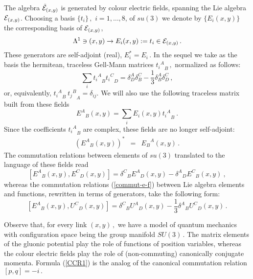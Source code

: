 \documentclass[a4paper,12pt]{article}
\begin{document}
The algebra $\tilde{\cal E}_{(x,y)}$ is generated by colour
electric fields, spanning the Lie algebra ${\cal E}_{(x,y)}$.
Choosing a basis $\{t_i \} \, ,$ $i = 1, \dots , 8$, of $su(3)$ we
denote by $\{ E_i(x,y)\}$ the corresponding basis of ${\cal
E}_{(x,y)}$,
\begin{equation}
{\Lambda}^1 \ni (x,y) \rightarrow  {E}_i(x,y) :=  t_i \in {\cal
E}_{(x,y)} \, .
\end{equation}
These generators are self-adjoint (real), $E_i^* = E_i \, .$ In
the sequel we take as the basis the hermitean, traceless Gell-Mann
matrices ${{t_i}^A}_B \, ,$ normalized as follows:
\begin{equation}
\sum_i { { t_i}^A}_B { { t_i}^C}_D = \delta^A_D \delta^C_B - \frac
13 \delta^A_B \delta^C_D \, ,
\end{equation}
or, equivalently, $  { { t_i}^A}_B \ { { t_j}^B}_A = \delta_{ij}
$. We will also use the following traceless matrix built from
these fields
\begin{equation}
{E^A}_B(x,y) = \sum_i E_i (x,y) { { t_i}^A}_B \  . \label{EABEi}
\end{equation}
Since the coefficients ${ { t_i}^A}_B$ are complex, these fields
are no longer self-adjoint:
\begin{eqnarray}
\label{self-adj} ({E^A}_B(x,y))^* & = & {E_B}^A(x,y) \, .
\end{eqnarray}
The commutation relations between elements of $su(3)$ translated
to the language of these fields read
\begin{equation}
\label{CCR2} [{E^A}_B(x,y) , {E^C}_D(x,y)] = {\delta^C}_B
{E^A}_D(x,y)  - {\delta^A}_D {E^C}_B(x,y)   \ ,
\end{equation}
whereas the commutation relations (\ref{commut-e-f}) between Lie
algebra elements and functions, rewritten in terms of generators,
take the following form:
\begin{equation}
\label{CCR1} [{E^A}_B(x,y) , {U^C}_D(x,y)] = {\delta^C}_B
{U^A}_D(x,y) - \frac{1}{3} {\delta^A}_B {U^C}_D(x,y)   \, .
\end{equation}


Observe that, for every link $(x,y)\, ,$ we have a model of
quantum mechanics with configuration space being the group
manifold $SU(3)\, .$ The matrix elements of the gluonic potential
play the role of functions of position variables, whereas the
colour electric fields play the role of (non-commuting)
canonically conjugate momenta. Formula (\ref{CCR1}) is the analog
of the canonical commutation relation $[p,q]= - i \, .$
\end{document}
